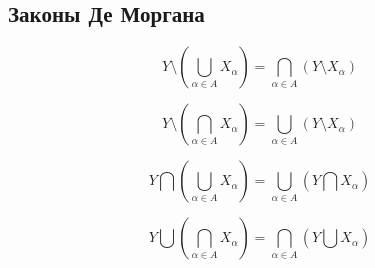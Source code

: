 \subsection{Законы Де Моргана}
	
	\begin{theorem*}
		\begin{equation}
			Y \setminus\left(\bigcup\limits_{\alpha \in A} X_\alpha \right) = \bigcap\limits_{\alpha \in A} \left( Y \setminus X_\alpha \right) 
		\end{equation}
		
		\begin{equation}
			Y \setminus\left(\bigcap\limits_{\alpha \in A} X_\alpha \right) = \bigcup\limits_{\alpha \in A} \left( Y \setminus X_\alpha \right) 
		\end{equation}
		
		\begin{equation}
			Y \bigcap \left(\bigcup\limits_{\alpha \in A} X_\alpha \right) =  \bigcup\limits_{\alpha \in A} \left(Y \bigcap X_\alpha \right)
		\end{equation}
		
		\begin{equation}
			 Y \bigcup \left(\bigcap\limits_{\alpha \in A} X_\alpha \right) =  \bigcap\limits_{\alpha \in A} \left(Y \bigcup X_\alpha \right)
		\end{equation}
	\end{theorem*}
	
